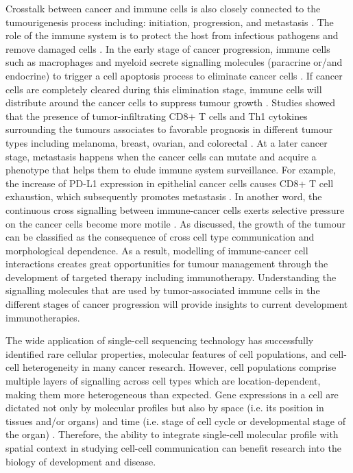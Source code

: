 Crosstalk between cancer and immune cells is also closely connected to the tumourigenesis process including: initiation, progression, and metastasis \cite{wang2017role}. The role of the immune system is to protect the host from infectious pathogens and remove damaged cells \cite{davis2007molecular}. In the early stage of cancer progression, immune cells such as macrophages and myeloid secrete signalling molecules (paracrine or/and endocrine) to trigger a cell apoptosis process to eliminate cancer cells \cite{wyckoff2007direct}. If cancer cells are completely cleared during this elimination stage, immune cells will distribute around the cancer cells to suppress tumour growth \cite{bronkhorst2011detection, ly2010aged}. Studies showed that the presence of tumor-infiltrating CD8+ T cells and Th1 cytokines surrounding the tumours associates to favorable prognosis in different tumour types including melanoma, breast, ovarian, and colorectal \cite{fridman2012immune, shalapour2015immunity}. At a later cancer stage, metastasis happens when the cancer cells can mutate and acquire a phenotype that helps them to elude immune system surveillance. For example, the increase of PD-L1 expression in epithelial cancer cells causes CD8+ T cell exhaustion, which subsequently promotes metastasis \cite{chen2014metastasis, wei2019combination}. In another word, the continuous cross signalling between immune-cancer cells exerts selective pressure on the cancer cells become more motile \cite{giampieri2009localized,ilina2009mechanisms}. As discussed, the growth of the tumour can be classified as the consequence of cross cell type communication and morphological dependence. As a result, modelling of immune-cancer cell interactions creates great opportunities for tumour management through the development of targeted therapy including immunotherapy. Understanding the signalling molecules that are used by tumor-associated immune cells in the different stages of cancer progression will provide insights to current development immunotherapies.  

The wide application of single-cell sequencing technology has successfully identified rare cellular properties, molecular features of cell populations, and cell-cell heterogeneity in many cancer research. However, cell populations comprise multiple layers of signalling across cell types which are location-dependent, making them more heterogeneous than expected. Gene expressions in a cell are dictated not only by molecular profiles but also by space (i.e. its position in tissues and/or organs) and time (i.e. stage of cell cycle or developmental stage of the organ) \cite{salomon2020genomic}. Therefore, the ability to integrate single-cell molecular profile with spatial context in studying cell-cell communication can benefit research into the biology of development and disease.

